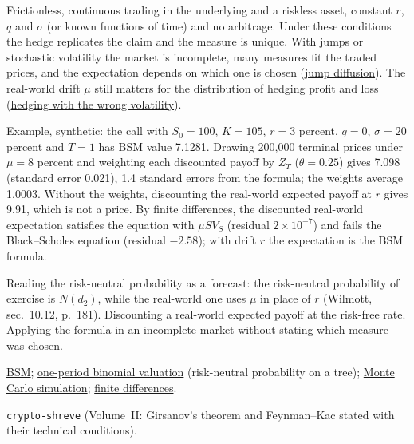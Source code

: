 \begin{qfresult}
 Frictionless, continuous trading in the underlying and a riskless asset, constant $r$, $q$ and $\sigma$ (or known functions of time) and no arbitrage. Under these conditions the hedge replicates the claim and the measure is unique. With jumps or stochastic volatility the market is incomplete, many measures fit the traded prices, and the expectation depends on which one is chosen (\hyperref[mod:merton-jump-diffusion]{jump diffusion}). The real-world drift $\mu$ still matters for the distribution of hedging profit and loss (\hyperref[res:delta-hedging-volatility-mismatch]{hedging with the wrong volatility}).

 Example, synthetic: the call with $S_0=100$, $K=105$, $r=3$ percent, $q=0$, $\sigma=20$ percent and $T=1$ has BSM value 7.1281. Drawing 200{,}000 terminal prices under $\mu=8$ percent and weighting each discounted payoff by $Z_T$ ($\theta=0.25$) gives 7.098 (standard error 0.021), 1.4 standard errors from the formula; the weights average 1.0003. Without the weights, discounting the real-world expected payoff at $r$ gives 9.91, which is not a price. By finite differences, the discounted real-world expectation satisfies the equation with $\mu SV_S$ (residual $2\times10^{-7}$) and fails the Black--Scholes equation (residual $-2.58$); with drift $r$ the expectation is the BSM formula.

 Reading the risk-neutral probability as a forecast: the risk-neutral probability of exercise is $N(d_2)$, while the real-world one uses $\mu$ in place of $r$ (Wilmott, sec.~10.12, p.~181). Discounting a real-world expected payoff at the risk-free rate. Applying the formula in an incomplete market without stating which measure was chosen.

 \hyperref[mod:black-scholes-merton]{BSM}; \hyperref[meth:one-period-binomial-valuation]{one-period binomial valuation} (risk-neutral probability on a tree); \hyperref[meth:monte-carlo-simulation]{Monte Carlo simulation}; \hyperref[meth:finite-difference-option-pricing]{finite differences}.

 \nolinkurl{crypto-shreve} (Volume~II: Girsanov's theorem and Feynman--Kac stated with their technical conditions).

\end{qfresult}
